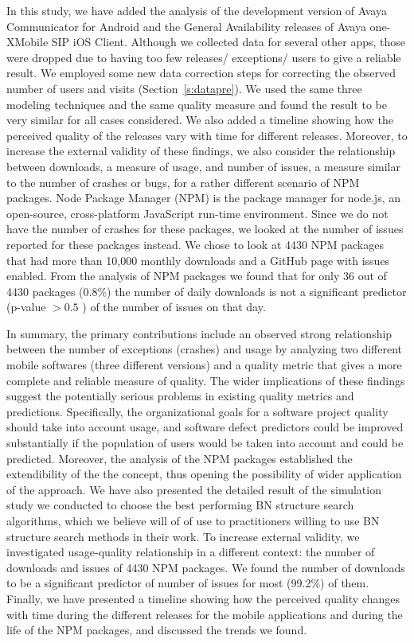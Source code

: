 \documentclass[smallextended]{svjour3}       %
\begin{document}
In this study, we have added the analysis of the development version 
of Avaya Communicator for Android and the
General Availability releases of Avaya one-X\textregistered  Mobile
SIP iOS Client. Although we collected data for several other apps,
those were dropped due to having too few releases/ exceptions/ users
to give a reliable result. We employed some new data correction steps 
for correcting the observed number of users and visits (Section~\ref{s:datapre}).
We used the same three modeling techniques and the same quality measure
 and found the result to be very similar for all cases considered. 
We also added a timeline showing how the perceived quality of
the releases vary with time for different releases.   
Moreover, to increase the external validity of these findings, we also consider
the relationship between downloads, a measure of usage, and number of 
issues, a measure similar to the number of crashes or bugs, for a rather
different scenario of NPM packages. Node Package Manager (NPM) is
the package manager for node.js, an open-source, cross-platform
JavaScript run-time environment.  Since we do not have the number of
crashes for these packages, we looked at the number of issues
reported for these packages instead. We chose to look at 4430 NPM packages
that had more than 10,000 monthly downloads and a GitHub page with issues enabled.
From the analysis of NPM packages we found that for only 36 out of
4430 packages (0.8\%) the number of daily downloads is not a
significant predictor (p-value $> 0.5$ ) of the number of issues on
that day. 

In summary, the primary contributions include an observed strong
relationship between the number of exceptions (crashes) and usage by
analyzing two different mobile softwares (three different versions)
and a quality metric that gives a more
complete and reliable measure of quality. The wider implications of
these findings suggest the potentially serious problems in existing
quality metrics and predictions. Specifically, the organizational
goals for a software project quality should take into account usage,
and software defect predictors could be improved substantially if
the population of users would be taken into account and could be
predicted. Moreover, the analysis of the NPM packages established the
extendibility of the the concept, thus opening the possibility of
wider application of the approach. We have also presented the 
detailed result of the simulation study
we conducted to choose the best performing BN structure search
algorithms, which we believe will of of use to practitioners willing
to use BN structure search methods in their work. To increase
external validity, we investigated usage-quality relationship in a
different context: the number of downloads and issues of 4430 NPM
packages. We found the number of downloads to be a significant
predictor of number of issues for most (99.2\%) of them. Finally, we
have presented a timeline showing how the perceived quality changes
with time during the different releases for the mobile applications
and during the life of the NPM packages, and discussed the trends we
found.
\end{document}
